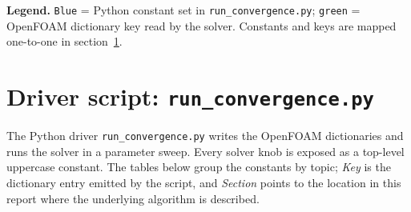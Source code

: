 \documentclass[11pt,a4paper]{article}
\newcommand{\pyconst}[1]{\textcolor{black!60!blue}{\texttt{\footnotesize #1}}}
\newcommand{\dictkey}[1]{\textcolor{black!60!green}{\texttt{\footnotesize #1}}}
\newcommand{\code}[1]{\texttt{\small #1}}
\begin{document}
\noindent\textbf{Legend.} \pyconst{Blue} = Python constant set in
\code{run\_convergence.py}; \dictkey{green} = OpenFOAM dictionary key
read by the solver. Constants and keys are mapped one-to-one in
section~\ref{sec:driver}.

\section{Driver script: \texttt{run\_convergence.py}}
\label{sec:driver}

The Python driver \code{run\_convergence.py} writes the OpenFOAM
dictionaries and runs the solver in a parameter sweep. Every solver
knob is exposed as a top-level uppercase constant. The tables below
group the constants by topic; \emph{Key} is the dictionary entry
emitted by the script, and \emph{Section} points to the location in
this report where the underlying algorithm is described.
\end{document}
